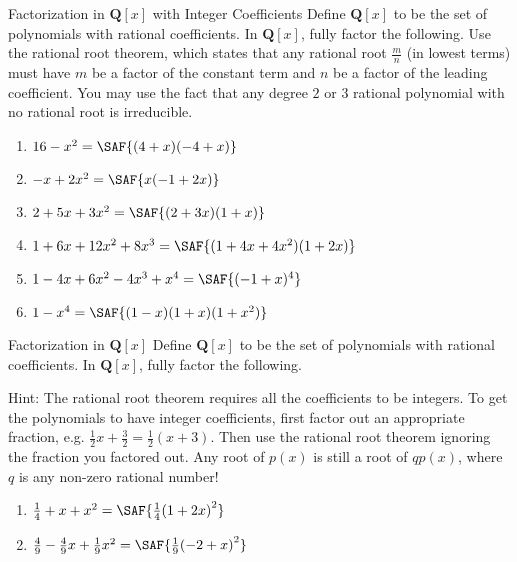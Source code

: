 \documentclass[12pt,letterpaper]{article}
\begin{document}
\begin{problem}{Factorization in \(\mathbf{Q}[x]\) with Integer Coefficients}
  Define \(\mathbf{Q}[x]\) to be the set of polynomials with rational coefficients. In
  \(\mathbf{Q}[x]\), fully factor the following. Use the rational root theorem, which states
  that any rational root $\frac{m}{n}$ (in lowest terms) must have $m$ be a factor of the
  constant term and $n$ be a factor of the leading coefficient. You may use the fact that
  any degree $2$ or $3$ rational polynomial with no rational root is irreducible.

  \begin{enumerate}
    \item \(16 - x^2 = \SAF{(4 + x)(-4 + x)}\)
    \item \(-x + 2x^2 = \SAF{x(-1 + 2x)}\)
    \item \(2 + 5x + 3x^2 = \SAF{(2 + 3x)(1 + x)}\)
    \item \(1 + 6x + 12x^2 + 8x^3 = \SAF{(1 + 4x + 4x^2)(1 + 2x)}\)
    \item \(1 - 4x + 6x^2 - 4x^3 + x^4 = \SAF{(-1 + x)^4}\)
    \item \(1 - x^4 = \SAF{(1 - x)(1 + x)(1 + x^2)}\)
  \end{enumerate}
\end{problem}

\begin{problem}{Factorization in \(\mathbf{Q}[x]\)}
  Define \(\mathbf{Q}[x]\) to be the set of polynomials with rational coefficients. In
  \(\mathbf{Q}[x]\), fully factor the following.

  \vspace{1em}
  \noindent
  Hint: The rational root theorem requires all the coefficients to be integers. To get the
  polynomials to have integer coefficients, first factor out an appropriate fraction, e.g.
  $\frac{1}{2}x + \frac{3}{2} = \frac{1}{2}(x + 3)$. Then use the rational root theorem
  ignoring the fraction you factored out. Any root of $p(x)$ is still a root of $q p(x)$,
  where $q$ is any non-zero rational number!

  \begin{enumerate}
    \item \(\frac{1}{4} + x + x^2 = \SAF{\frac{1}{4}{(1 + 2x)}^2}\)
    \item \(\frac{4}{9} - \frac{4}{9}x + \frac{1}{9}x^2 = \SAF{\frac{1}{9}{(-2 + x)}^2}\)
  \end{enumerate}
\end{problem}
\end{document}
